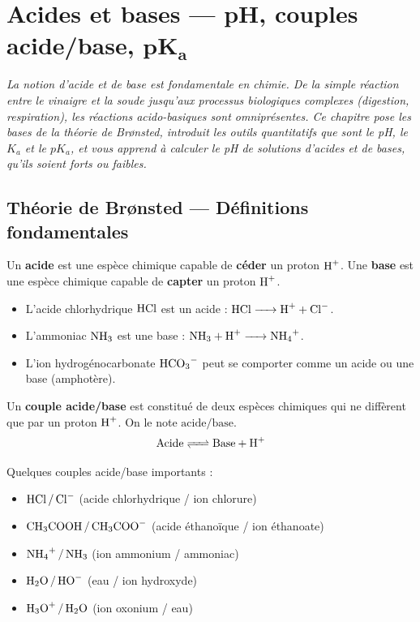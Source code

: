 \chapter{Acides et bases — pH, couples acide/base, \texorpdfstring{$\mathbf{pK_a}$}{pKa}}

\textit{La notion d'acide et de base est fondamentale en chimie. De la simple réaction entre le vinaigre et la soude jusqu'aux processus biologiques complexes (digestion, respiration), les réactions acido-basiques sont omniprésentes. Ce chapitre pose les bases de la théorie de Brønsted, introduit les outils quantitatifs que sont le pH, le $K_a$ et le $pK_a$, et vous apprend à calculer le pH de solutions d'acides et de bases, qu'ils soient forts ou faibles.}

\section{Théorie de Brønsted — Définitions fondamentales}

\begin{definition}
Un \textbf{acide} est une espèce chimique capable de \textbf{céder} un proton $\ce{H+}$.
Une \textbf{base} est une espèce chimique capable de \textbf{capter} un proton $\ce{H+}$.
\end{definition}

\begin{exemple}
\begin{itemize}
    \item L'acide chlorhydrique $\ce{HCl}$ est un acide : $\ce{HCl -> H+ + Cl-}$.
    \item L'ammoniac $\ce{NH3}$ est une base : $\ce{NH3 + H+ -> NH4+}$.
    \item L'ion hydrogénocarbonate $\ce{HCO3-}$ peut se comporter comme un acide ou une base (amphotère).
\end{itemize}
\end{exemple}

\begin{definition}
Un \textbf{couple acide/base} est constitué de deux espèces chimiques qui ne diffèrent que par un proton $\ce{H+}$. On le note $\text{acide}/\text{base}$.
\[
\ce{Acide <=> Base + H+}
\]
\end{definition}

\begin{exemple}
Quelques couples acide/base importants :
\begin{itemize}
    \item $\ce{HCl / Cl-}$ (acide chlorhydrique / ion chlorure)
    \item $\ce{CH3COOH / CH3COO-}$ (acide éthanoïque / ion éthanoate)
    \item $\ce{NH4+ / NH3}$ (ion ammonium / ammoniac)
    \item $\ce{H2O / HO-}$ (eau / ion hydroxyde)
    \item $\ce{H3O+ / H2O}$ (ion oxonium / eau)
\end{itemize}
\end{exemple}


